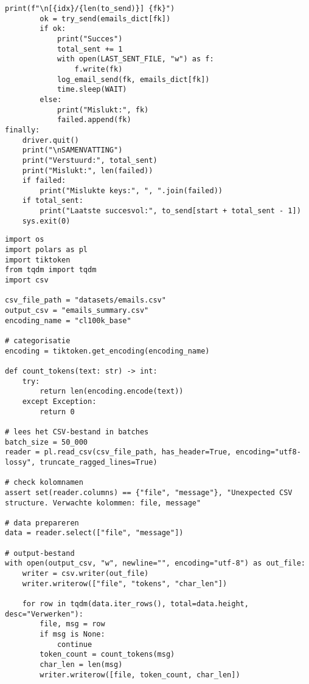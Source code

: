 \begin{lstlisting}[style=custompython,caption={Selenium WebDriver script voor automatisering van gegevensverwerking variabelen},label={lst:send-request}, captionpos=b]
        print(f"\n[{idx}/{len(to_send)}] {fk}")
        ok = try_send(emails_dict[fk])
        if ok:
            print("Succes")
            total_sent += 1
            with open(LAST_SENT_FILE, "w") as f:
                f.write(fk)
            log_email_send(fk, emails_dict[fk])
            time.sleep(WAIT)
        else:
            print("Mislukt:", fk)
            failed.append(fk)
finally:
    driver.quit()
    print("\nSAMENVATTING")
    print("Verstuurd:", total_sent)
    print("Mislukt:", len(failed))
    if failed:
        print("Mislukte keys:", ", ".join(failed))
    if total_sent:
        print("Laatste succesvol:", to_send[start + total_sent - 1])
    sys.exit(0)
\end{lstlisting}

\begin{lstlisting}[style=custompython,caption={Python-script voor het categoriseren en samenvatten van e-mails in een CSV-bestand},label={lst:e-mail-summary}, captionpos=b]
import os
import polars as pl
import tiktoken
from tqdm import tqdm
import csv

csv_file_path = "datasets/emails.csv"
output_csv = "emails_summary.csv"
encoding_name = "cl100k_base"

# categorisatie
encoding = tiktoken.get_encoding(encoding_name)

def count_tokens(text: str) -> int:
    try:
        return len(encoding.encode(text))
    except Exception:
        return 0

# lees het CSV-bestand in batches
batch_size = 50_000
reader = pl.read_csv(csv_file_path, has_header=True, encoding="utf8-lossy", truncate_ragged_lines=True)

# check kolomnamen
assert set(reader.columns) == {"file", "message"}, "Unexpected CSV structure. Verwachte kolommen: file, message"

# data prepareren
data = reader.select(["file", "message"])

# output-bestand
with open(output_csv, "w", newline="", encoding="utf-8") as out_file:
    writer = csv.writer(out_file)
    writer.writerow(["file", "tokens", "char_len"])

    for row in tqdm(data.iter_rows(), total=data.height, desc="Verwerken"):
        file, msg = row
        if msg is None:
            continue
        token_count = count_tokens(msg)
        char_len = len(msg)
        writer.writerow([file, token_count, char_len])
\end{lstlisting}

